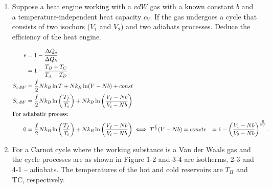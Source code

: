 \documentclass{zc-ust-hw}
\begin{document}
\begin{enumerate}
\item Suppose a heat engine working with a $vdW$ gas with a known constant $b$
  and a temperature-independent heat capacity $c_V$. If the gas undergoes a
  cycle that consists of two isochors ($V_1$ and $V_2$) and two adiabats
  processes. Deduce the efficiency of the heat engine.
  \begin{sol}
    \begin{align}
      e &= 1-\frac{\Delta Q_c}{\Delta Q_h} \\
      &= 1-\frac{T_B-T_C}{T_A-T_D} \\
      S_{vdW}&=\frac{f}{2}Nk_B\ln T+Nk_B\ln (V-Nb)+const \\
      S_{vdW}&=\frac{f}{2}Nk_B\ln \left( \frac{T_f}{T_i} \right) +Nk_B\ln \left( \frac{V_f-Nb}{V_i-Nb} \right) \\
      \intertext{For adiabatic process:}
      0&=\frac{f}{2}Nk_B\ln \left( \frac{T_f}{T_i} \right) +Nk_B\ln \left( \frac{V_f-Nb}{V_i-Nb} \right) \iff T^{\frac{f}{2}}(V-Nb)=const 
      e&=1-\left( \frac{V_1-Nb}{V_2-Nb} \right)^{\frac{R}{c_V}} 
    .\end{align}
  \end{sol}

  \newpage

\item For a Carnot cycle where the working substance is a Van der Waals gas and
  the cycle processes are as shown in Figure 1-2 and 3-4 are isotherms, 2-3 and
  4-1 – adiabats. The temperatures of the hot and cold reservoirs are $T_H$ and
  TC, respectively.


\end{enumerate}
\end{document}
